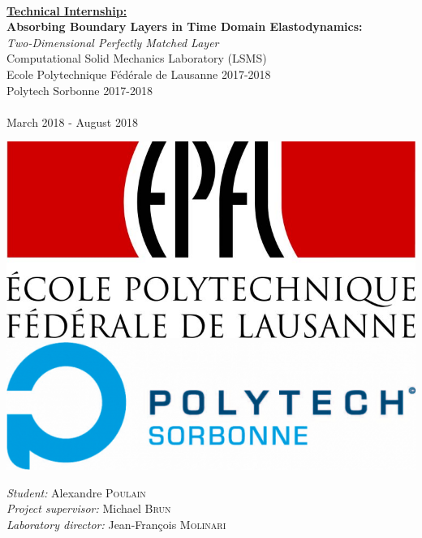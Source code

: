\begin{titlepage}
\begin{sffamily}
\begin{center}
    \vspace*{2cm}
    \noindent\hrulefill \\
    \vspace*{1cm}
    {\huge \bfseries \underline{Technical Internship:}} \\ [0.5cm]
    {\huge \bfseries Absorbing Boundary Layers in Time Domain Elastodynamics: }\\[0.5cm]
    {\huge  \itshape Two-Dimensional Perfectly Matched Layer} \\[0.5cm]
    {\large Computational Solid Mechanics Laboratory  (LSMS)}\\[0.5cm]
    {\large Ecole Polytechnique Fédérale de Lausanne 2017-2018}\\[0.5cm]
    {\large Polytech Sorbonne 2017-2018}\\[0.5cm]
    \noindent\hrulefill \\
    \vspace{1cm}
    March 2018 - August 2018   \\[1cm] 
\begin{minipage}{.5\textwidth}
  \centering
  \includegraphics[width=.98\linewidth]{images/EPFL-Logo.jpg}\\[0.3cm]
  \includegraphics[width=.98\linewidth]{images/polytech-s-logo.jpeg}
\end{minipage}%
\begin{minipage}{.5\textwidth}
  \centering
  \emph{Student:} Alexandre \textsc{Poulain}\\[1cm]
    \emph{Project supervisor:} Michael \textsc{Brun}\\[1cm]
    \emph{Laboratory director:} Jean-François \textsc{Molinari}


\end{minipage}
\end{center}
\end{sffamily}
\end{titlepage}
